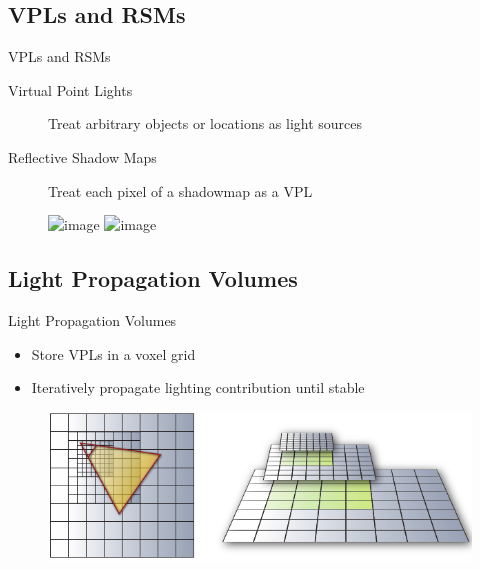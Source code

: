 \documentclass[10pt]{beamer}
\begin{document}
\subsection{VPLs and RSMs}
\begin{frame}{VPLs and RSMs}
  \begin{description}
    \item[Virtual Point Lights] Treat arbitrary objects or locations as light sources
    \item[Reflective Shadow Maps] Treat each pixel of a shadowmap as a VPL %
  \end{description}

  \begin{figure}
    \includegraphics<+>[width=\textwidth]{rsm.png}
    \includegraphics<+>[width=\textwidth]{rsm_vpl.png}
  \end{figure}

\end{frame}

\subsection{Light Propagation Volumes}
\begin{frame}{Light Propagation Volumes}

  \begin{itemize}
    \item Store VPLs in a voxel grid
    \item Iteratively propagate lighting contribution until stable
  \end{itemize}

  \begin{figure}
    \includegraphics[width=\textwidth]{lpv.png}
  \end{figure}
\end{frame}
\end{document}

